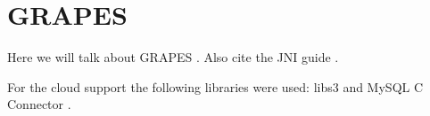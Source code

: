 \chapter{GRAPES}
Here we will talk about GRAPES \cite{GRAPES}.
Also cite the JNI guide \cite{JNIGuide}.

For the cloud support the following libraries were used: libs3
\cite{LibS3} and MySQL C Connector \cite{MySQLConnectorC}.
